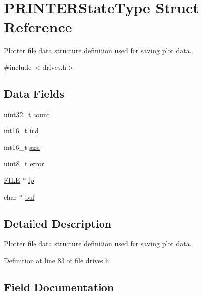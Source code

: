 \hypertarget{structPRINTERStateType}{}\section{P\+R\+I\+N\+T\+E\+R\+State\+Type Struct Reference}
\label{structPRINTERStateType}


Plotter file data structure definition used for saving plot data.  




{\ttfamily \#include $<$drives.\+h$>$}

\subsection*{Data Fields}
\begin{DoxyCompactItemize}
\item 
uint32\+\_\+t \hyperlink{structPRINTERStateType_ae115fc351910f3801e37b31f254fb8f4}{count}
\item 
int16\+\_\+t \hyperlink{structPRINTERStateType_a7d8873d0011f31d7dd00c2b7e0d362bd}{ind}
\item 
int16\+\_\+t \hyperlink{structPRINTERStateType_ac6d8323e47879ed58e7fa2cc7cfd7c30}{size}
\item 
uint8\+\_\+t \hyperlink{structPRINTERStateType_a6e5b550f5396901febd5475445132dd0}{error}
\item 
\hyperlink{posix_8h_aed4dabeb9f7c518ded42f930a04abce8}{F\+I\+LE} $\ast$ \hyperlink{structPRINTERStateType_a791c78d68d169f9d2e60d34b890e520a}{fp}
\item 
char $\ast$ \hyperlink{structPRINTERStateType_aa48220761aa3c77c954a55f09388c615}{buf}
\end{DoxyCompactItemize}


\subsection{Detailed Description}
Plotter file data structure definition used for saving plot data. 

Definition at line 83 of file drives.\+h.



\subsection{Field Documentation}
\mbox{\label{structPRINTERStateType_aa48220761aa3c77c954a55f09388c615}} 
